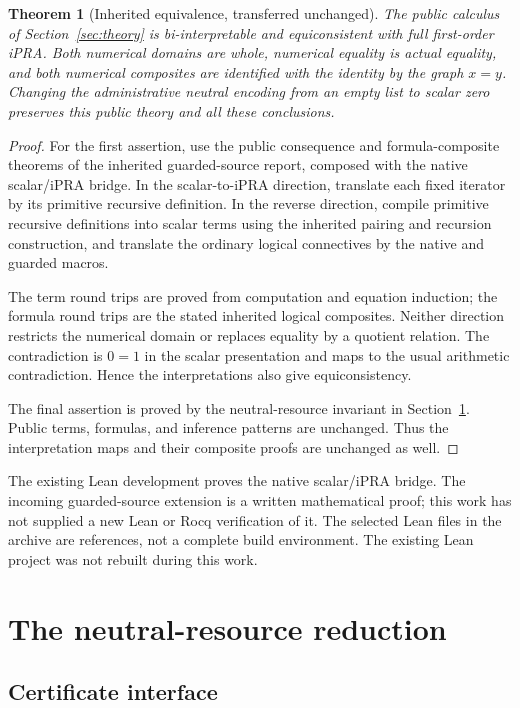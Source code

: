 \documentclass[11pt,letterpaper]{article}
\newtheorem{theorem}{Theorem}[section]
\theoremstyle{definition}
\theoremstyle{remark}
\begin{document}
\begin{theorem}[Inherited equivalence, transferred unchanged]
The public calculus of Section~\ref{sec:theory} is bi-interpretable and
equiconsistent with full first-order iPRA. Both numerical domains are
whole, numerical equality is actual equality, and both numerical
composites are identified with the identity by the graph $x=y$.
Changing the administrative neutral encoding from an empty list to scalar
zero preserves this public theory and all these conclusions.
\end{theorem}
\begin{proof}
For the first assertion, use the public consequence and formula-composite
theorems of the inherited guarded-source report, composed with the native
scalar/iPRA bridge. In the scalar-to-iPRA direction, translate each fixed
iterator by its primitive recursive definition. In the reverse direction,
compile primitive recursive definitions into scalar terms using the
inherited pairing and recursion construction, and translate the ordinary
logical connectives by the native and guarded macros.

The term round trips are proved from computation and equation induction;
the formula round trips are the stated inherited logical composites.
Neither direction restricts the numerical domain or replaces equality by
a quotient relation. The contradiction is $0=1$ in the scalar presentation
and maps to the usual arithmetic contradiction. Hence the interpretations
also give equiconsistency.

The final assertion is proved by the neutral-resource invariant in
Section~\ref{sec:neutral}. Public terms, formulas, and inference patterns
are unchanged. Thus the interpretation maps and their composite proofs
are unchanged as well.
\end{proof}

The existing Lean development proves the native scalar/iPRA bridge.
The incoming guarded-source extension is a written mathematical proof;
this work has not supplied a new Lean or Rocq verification of it. The
selected Lean files in the archive are references, not a complete build
environment. The existing Lean project was not rebuilt during this work.

\section{The neutral-resource reduction}
\label{sec:neutral}

\subsection{Certificate interface}
\end{document}
